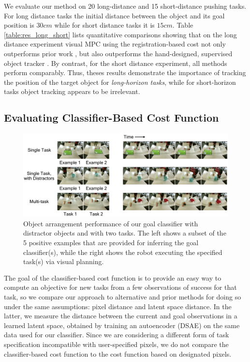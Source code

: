 We evaluate our method on 20 long-distance and 15 short-distance pushing tasks. For long distance tasks the initial distance between the object and its goal position is $30cm$ while for short distance tasks it is $15cm$. Table \ref{table:res_long_short} lists quantitative comparisons showing that on the long distance experiment
visual MPC using the registration-based cost not only outperforms prior work \cite{sna}, but also outperforms the hand-designed, supervised object tracker \cite{babenko2009visual}. By contrast, for the short distance experiment,
all methods perform comparably. Thus, theses results demonstrate the importance of tracking the position of the target object for \emph{long-horizon tasks}, while for short-horizon tasks object tracking appears to be irrelevant. 
\subsection{Evaluating Classifier-Based Cost Function}
\label{subsec:eval_classifier}

\begin{figure}
	\centering
	\includegraphics[width=1.0\columnwidth]{images_cls/cls_results_2.jpeg}
	\caption{\small Object arrangement performance of our goal classifier with distractor objects and with two tasks. The left shows a subset of the 5 positive examples that are provided for inferring the goal classifier(s), while the right shows the robot executing the specified task(s) via visual planning.}
	\label{fig:cls_results}
	\vspace{-0.3cm}
\end{figure}

The goal of the classifier-based cost function is to provide an easy way to compute an objective for new tasks from a few observations of success for that task, so we compare our approach to alternative and prior methods for doing so under the same assumptions: pixel distance and latent space distance. In the latter, we measure the distance between the current and goal observations in a learned latent space, obtained by training an autoencoder (DSAE) \cite{dsae} on the same data used for our classifier. Since we are considering a different form of task specification incompatible with user-specified pixels, we do not compare the classifier-based cost function to the cost function based on designated pixels.


